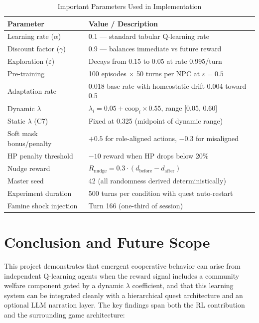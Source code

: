 \documentclass[12pt, a4paper, oneside]{report}
\begin{document}
\begin{table}[H]
\centering
\caption{Important Parameters Used in Implementation}
\label{tab:parameters}
\begin{tabularx}{\textwidth}{|l|X|}
\hline
\textbf{Parameter} & \textbf{Value / Description} \\
\hline
Learning rate ($\alpha$) & 0.1 --- standard tabular Q-learning rate \\
\hline
Discount factor ($\gamma$) & 0.9 --- balances immediate vs future reward \\
\hline
Exploration ($\varepsilon$) & Decays from 0.15 to 0.05 at rate 0.995/turn \\
\hline
Pre-training & 100 episodes $\times$ 50 turns per NPC at $\varepsilon = 0.5$ \\
\hline
Adaptation rate & 0.018 base rate with homeostatic drift 0.004 toward 0.5 \\
\hline
Dynamic $\lambda$ & $\lambda_i = 0.05 + \text{coop}_i \times 0.55$, range [0.05, 0.60] \\
\hline
Static $\lambda$ (C7) & Fixed at 0.325 (midpoint of dynamic range) \\
\hline
Soft mask bonus/penalty & $+0.5$ for role-aligned actions, $-0.3$ for misaligned \\
\hline
HP penalty threshold & $-10$ reward when HP drops below 20\% \\
\hline
Nudge reward & $R_{\text{nudge}} = 0.3 \cdot (d_{\text{before}} - d_{\text{after}})$ \\
\hline
Master seed & 42 (all randomness derived deterministically) \\
\hline
Experiment duration & 500 turns per condition with quest auto-restart \\
\hline
Famine shock injection & Turn 166 (one-third of session) \\
\hline
\end{tabularx}
\end{table}

\chapter{Conclusion and Future Scope}
\label{chap:conclusion}

This project demonstrates that emergent cooperative behavior can arise from independent Q-learning agents when the reward signal includes a community welfare component gated by a dynamic $\lambda$ coefficient, and that this learning system can be integrated cleanly with a hierarchical quest architecture and an optional LLM narration layer. The key findings span both the RL contribution and the surrounding game architecture:
\end{document}
